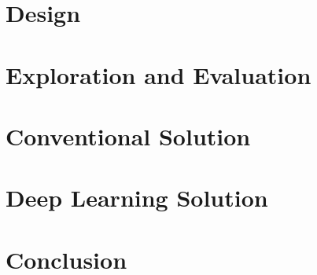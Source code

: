 \documentclass{article}
\begin{document}
\section{Design} 

\section{Exploration and Evaluation}

\section{Conventional Solution}

\section{Deep Learning Solution}

\section{Conclusion}

\printbibliography[heading=bibintoc,title={References}]
\end{document}
